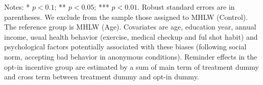 \documentclass[
]{article}
\begin{document}
\begin{table}
\begin{threeparttable}
\begin{tabular}[t]{lcccc}
\bottomrule
\end{tabular}
\begin{tablenotes}
\item Notes: * $p < 0.1$; ** $p < 0.05$; *** $p < 0.01$. Robust standard errors are in parentheses. We exclude from the sample those assigned to MHLW (Control). The reference group is MHLW (Age). Covariates are age, education year, annual income, usual health behavior (exercise, medical checkup and ful shot habit) and psychological factors potentially associated with these biases (following social norm, accepting bad behavior in anonymous conditions). Reminder effects in the opt-in incentive group are estimated by a sum of main term of treatment dummy and cross term between treatment dummy and opt-in dummy.
\end{tablenotes}
\end{threeparttable}
\end{table}
\end{document}
